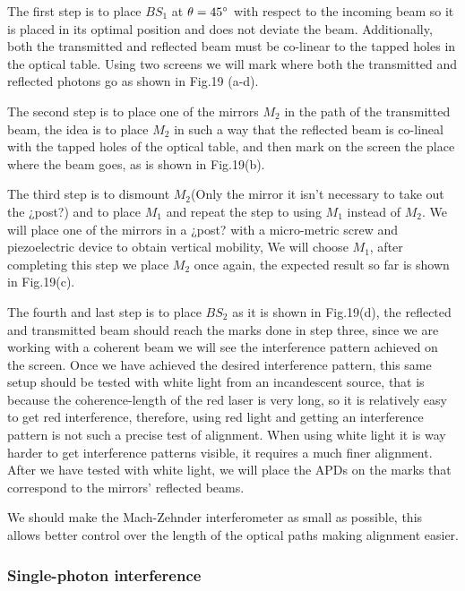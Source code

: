 \documentclass[12pt]{article}
\begin{document}
The first step is to place $BS_{1}$ at $\theta=45\degree$ with respect to the incoming beam so it is placed in its optimal position and does not deviate the beam. Additionally, both the transmitted and reflected beam must be co-linear to the tapped holes in the optical table. Using two screens we will mark where both the transmitted and reflected photons go as shown in Fig.19 (a-d).

The second step is to place one of the mirrors $M_{2}$ in the path of the transmitted beam, the idea is to place $M_{2}$ in such a way that the reflected beam is co-lineal with the tapped holes of the optical table, and then mark on the screen the place where the beam goes, as is shown in Fig.19(b).

The third step is to dismount $M_{2}$(Only the mirror it isn't necessary to take out the ¿post?) and to place $M_{1}$ and repeat the step to using $M_{1}$ instead of $M_{2}$. We will place one of the mirrors in a ¿post? with a micro-metric screw and piezoelectric device to obtain vertical mobility, We will choose $M_{1}$, after completing this step we place $M_{2}$ once again, the expected result so far is shown in Fig.19(c).

The fourth and last step is to place $BS_{2}$ as it is shown in Fig.19(d), the reflected and transmitted beam should reach the marks done in step three, since we are working with a coherent beam we will see the interference pattern achieved on the screen. Once we have achieved the desired interference pattern, this same setup should be tested with white light from an incandescent source, that is because the coherence-length of the red laser is very long, so it is relatively easy to get red interference, therefore, using red light and getting an interference pattern is not such a precise test of alignment. When using white light it is way harder to get interference patterns visible, it requires a much finer alignment. After we have tested with white light, we will place the APDs on the marks that correspond to the mirrors' reflected beams.


We should make the Mach-Zehnder interferometer as small as possible, this allows better control over the length of the optical paths making alignment easier.

\subsubsection{Single-photon interference}
\end{document}
